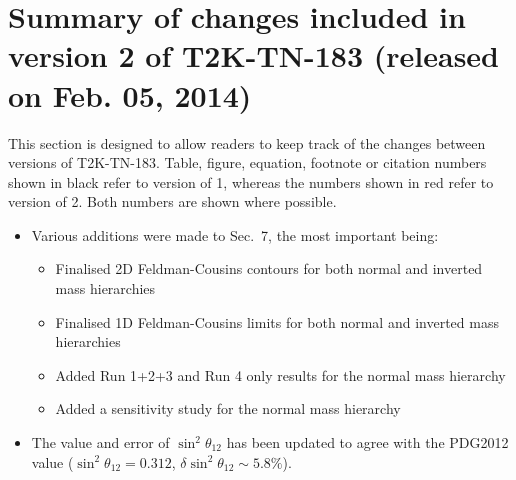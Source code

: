 \clearpage

\section{Summary of changes included in version 2 of T2K-TN-183 (released on Feb. 05, 2014)}

This section is designed to allow readers to keep track of the changes between versions of T2K-TN-183.
Table, figure, equation, footnote or citation numbers shown in black refer to version of 1,
{\color{red}whereas the numbers shown in red refer to version of 2}.
Both numbers are shown where possible.

\begin{itemize}

\item Various additions were made to Sec.\ 7, the most important being:

  \begin{itemize}
  \item Finalised 2D Feldman-Cousins contours for both normal and inverted mass hierarchies
  \item Finalised 1D Feldman-Cousins limits for both normal and inverted mass hierarchies
  \item Added Run 1+2+3 and Run 4 only results for the normal mass hierarchy
  \item Added a sensitivity study for the normal mass hierarchy
  \end{itemize}
  
\item The value and error of $\sin^2\theta_{12}$ has been updated to agree with the PDG2012 value ($\sin^2\theta_{12} = 0.312$, $\delta\sin^2\theta_{12} \sim 5.8\%$).
  
\end{itemize}





